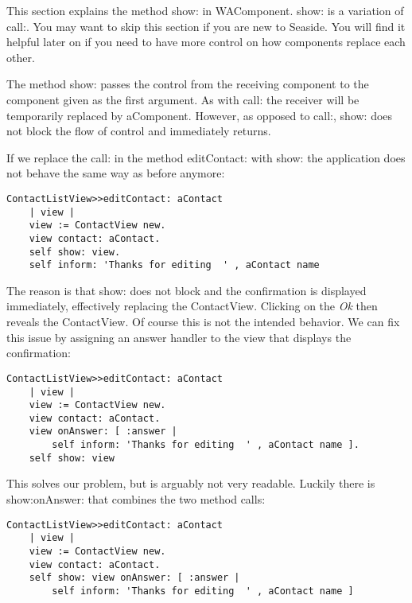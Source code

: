 \documentclass[a4paper,10pt,twoside]{book}
\newcommand{\ct}[1]{{\small\ttfamily\textup{#1}}}
\begin{document}
  

This section explains the method \ct{show:} in \ct{WAComponent}. \ct{show:} is a variation of \ct{call:}. You may want to skip this section if you are new to Seaside. You will find it helpful later on if you need to have more control on how components replace each other.

The method \ct{show:} passes the control from the receiving component to the component given as the first argument. As with \ct{call:} the receiver will be temporarily replaced by \ct{aComponent}. However, as opposed to \ct{call:}, \ct{show:} does not block the flow of control and immediately returns.

If we replace the \ct{call:} in the method \ct{editContact:} with \ct{show:} the application does not behave the same way as before anymore:

\begin{lstlisting}
ContactListView>>editContact: aContact
    | view |
    view := ContactView new.
    view contact: aContact.
    self show: view.
    self inform: 'Thanks for editing  ' , aContact name
\end{lstlisting}

The reason is that \ct{show:} does not block and the confirmation is displayed immediately, effectively replacing the \ct{ContactView}. Clicking on the \textit{Ok} then reveals the \ct{ContactView}. Of course this is not the intended behavior. We can fix this issue by assigning an answer handler to the view that displays the confirmation:

\begin{lstlisting}
ContactListView>>editContact: aContact
    | view |
    view := ContactView new.
    view contact: aContact.
    view onAnswer: [ :answer |
        self inform: 'Thanks for editing  ' , aContact name ].
    self show: view
\end{lstlisting}

This solves our problem, but is arguably not very readable. Luckily there is \ct{show:onAnswer:} that combines the two method calls:

\begin{lstlisting}
ContactListView>>editContact: aContact
    | view |
    view := ContactView new.
    view contact: aContact.
    self show: view onAnswer: [ :answer |
        self inform: 'Thanks for editing  ' , aContact name ]
\end{lstlisting}
\end{document}
